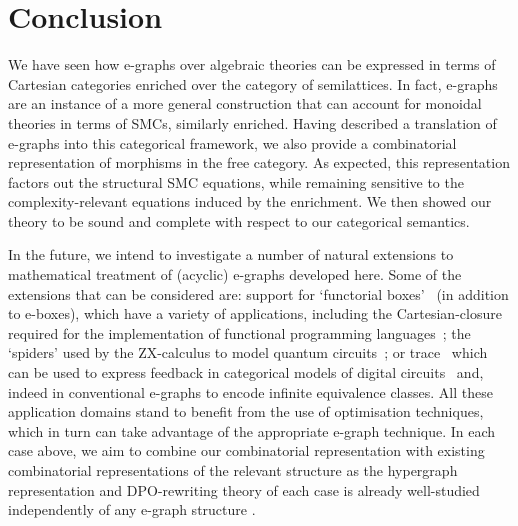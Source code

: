 \section{Conclusion}
\label{sec:conclusion}

We have seen how e-graphs over algebraic theories can be expressed in terms of Cartesian categories enriched over the category of semilattices. 
In fact, e-graphs are an instance of a more general construction that can account for monoidal theories in terms of SMCs,  similarly enriched.  
Having described a translation of e-graphs into this categorical framework, we also provide a combinatorial representation of morphisms in the free category.
As expected, this representation factors out the structural SMC equations, while remaining sensitive to the complexity-relevant equations induced by the enrichment.  
We then showed our theory to be sound and complete with respect to our categorical semantics.

In the future,  we intend to investigate a number of natural extensions to mathematical treatment of (acyclic) e-graphs developed here.
Some of the extensions that can be considered are: support for `functorial boxes'~\cite{mellies_functorial_2006} (in addition to e-boxes), which have a variety of applications, including the Cartesian-closure required for the implementation of functional programming languages~\cite{ghica-zanassi2023string};
the `spiders' used by the ZX-calculus to model quantum circuits~\cite{coecke_interacting_2011,ZX};
or trace~\cite{joyal_geometry_1991, Hasegawa-traced} which can be used to express feedback in categorical models of digital circuits~\cite{ghica_jung_2017,ghica_compositional_2023} and, indeed in conventional e-graphs to encode infinite equivalence classes.
All these application domains stand to benefit from the use of optimisation techniques, which in turn can take advantage of the appropriate e-graph technique.
In each case above,  we aim to combine our combinatorial representation with existing combinatorial representations of the relevant structure as the hypergraph representation and DPO-rewriting theory of each case is already well-studied independently of any e-graph structure \cite{ghica_rewriting_2023,alvarez-picallo-functorial_2021}.


